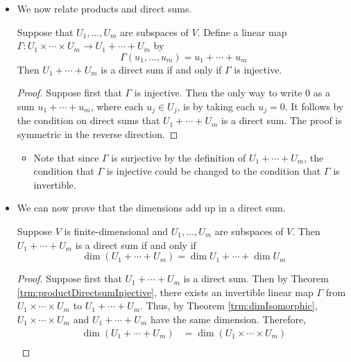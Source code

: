 \documentclass[../main.tex]{subfiles}
\begin{document}
\begin{itemize}
\begin{theorem}
\begin{proof}
        \end{proof}
    \end{theorem}
    \item We now relate products and direct sums.
    \begin{theorem}\label{trm:productDirectsumInjective}
        Suppose that $U_1,\dots,U_m$ are subspaces of $V$. Define a linear map $\Gamma:U_1\times\cdots\times U_m\to U_1+\cdots+U_m$ by
        \begin{equation*}
            \Gamma(u_1,\dots,u_m) = u_1+\cdots+u_m
        \end{equation*}
        Then $U_1+\cdots+U_m$ is a direct sum if and only if $\Gamma$ is injective.
        \begin{proof}
            Suppose first that $\Gamma$ is injective. Then the only way to write 0 as a sum $u_1+\cdots+u_m$, where each $u_j\in U_j$, is by taking each $u_j=0$. It follows by the condition on direct sums that $U_1+\cdots+U_m$ is a direct sum. The proof is symmetric in the reverse direction.
        \end{proof}
    \end{theorem}
    \begin{itemize}
        \item Note that since $\Gamma$ is surjective by the definition of $U_1+\cdots+U_m$, the condition that $\Gamma$ is injective could be changed to the condition that $\Gamma$ is invertible.
    \end{itemize}
    \item We can now prove that the dimensions add up in a direct sum.
    \begin{theorem}
        Suppose $V$ is finite-dimensional and $U_1,\dots,U_m$ are subspaces of $V$. Then $U_1+\cdots+U_m$ is a direct sum if and only if
        \begin{equation*}
            \dim(U_1+\cdots+U_m) = \dim U_1+\cdots+\dim U_m
        \end{equation*}
        \begin{proof}
            Suppose first that $U_1+\cdots+U_m$ is a direct sum. Then by Theorem \ref{trm:productDirectsumInjective}, there exists an invertible linear map $\Gamma$ from $U_1\times\cdots\times U_m$ to $U_1+\cdots+U_m$. Thus, by Theorem \ref{trm:dimIsomorphic}, $U_1\times\cdots\times U_m$ and $U_1+\cdots+U_m$ have the same dimension. Therefore,
            \begin{align*}
                \dim(U_1+\cdots+U_m) &= \dim(U_1\times\cdots\times U_m)\\

\end{align*}
\end{proof}
\end{theorem}
\end{itemize}
\end{document}

